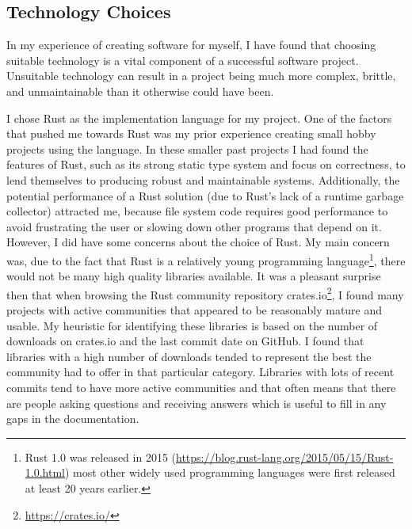 \subsection{Technology Choices}

In my experience of creating software for myself, I have found that choosing
suitable technology is a vital component of a successful software project.
Unsuitable technology can result in a project being much more complex, brittle,
and unmaintainable than it otherwise could have been.

I chose Rust as the implementation language for my project. One of the factors
that pushed me towards Rust was my prior experience creating small hobby
projects using the language. In these smaller past projects I had found the
features of Rust, such as its strong static type system and focus on
correctness, to lend themselves to producing robust and maintainable systems.
Additionally, the potential performance of a Rust solution (due to Rust's lack
of a runtime garbage collector) attracted me, because file system code requires
good performance to avoid frustrating the user or slowing down other programs
that depend on it. However, I did have some concerns about the choice of Rust.
My main concern was, due to the fact that Rust is a relatively young
programming language\footnote{Rust 1.0 was released in 2015
(\url{https://blog.rust-lang.org/2015/05/15/Rust-1.0.html}) most other widely
used programming languages were first released at least 20 years earlier.},
there would not be many high quality libraries available. It was a pleasant
surprise then that when browsing the Rust community repository
crates.io\footnote{\url{https://crates.io/}}, I found many projects with active
communities that appeared to be reasonably mature and usable. My heuristic for
identifying these libraries is based on the number of downloads on crates.io
and the last commit date on GitHub. I found that libraries with a high number
of downloads tended to represent the best the community had to offer in that
particular category. Libraries with lots of recent commits tend to have more
active communities and that often means that there are people asking questions
and receiving answers which is useful to fill in any gaps in the documentation.

